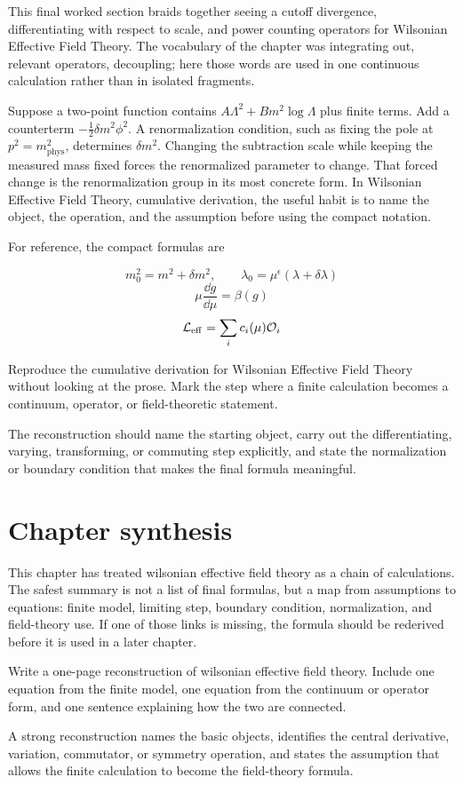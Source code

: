 This final worked section braids together seeing a cutoff divergence, differentiating with respect to scale, and power counting operators for Wilsonian Effective Field Theory.  The vocabulary of the chapter was integrating out, relevant operators, decoupling; here those words are used in one continuous calculation rather than in isolated fragments.

Suppose a two-point function contains \(A\Lambda^2+B m^2\log\Lambda\) plus finite terms.  Add a counterterm \(-\frac12\delta m^2\phi^2\).  A renormalization condition, such as fixing the pole at \(p^2=m_{\mathrm{phys}}^2\), determines \(\delta m^2\).  Changing the subtraction scale while keeping the measured mass fixed forces the renormalized parameter to change.  That forced change is the renormalization group in its most concrete form.  In Wilsonian Effective Field Theory, cumulative derivation, the useful habit is to name the object, the operation, and the assumption before using the compact notation.

For reference, the compact formulas are

\[
  m_0^2=m^2+\delta m^2,\qquad \lambda_0=\mu^\epsilon(\lambda+\delta\lambda)
\]
\[
  \mu\frac{\dd g}{\dd\mu}=\beta(g)
\]
\[
  \mathcal L_{\mathrm{eff}}=\sum_i c_i(\mu)\mathcal O_i
\]

\begin{exercise}
Reproduce the cumulative derivation for Wilsonian Effective Field Theory without looking at the prose.  Mark the step where a finite calculation becomes a continuum, operator, or field-theoretic statement.
\begin{answer}
The reconstruction should name the starting object, carry out the differentiating, varying, transforming, or commuting step explicitly, and state the normalization or boundary condition that makes the final formula meaningful.
\end{answer}
\end{exercise}



\section{Chapter synthesis}

This chapter has treated wilsonian effective field theory as a chain of calculations.  The safest summary is not a list of final formulas, but a map from assumptions to equations: finite model, limiting step, boundary condition, normalization, and field-theory use.  If one of those links is missing, the formula should be rederived before it is used in a later chapter.

\begin{exercise}
Write a one-page reconstruction of wilsonian effective field theory.  Include one equation from the finite model, one equation from the continuum or operator form, and one sentence explaining how the two are connected.
\begin{answer}
A strong reconstruction names the basic objects, identifies the central derivative, variation, commutator, or symmetry operation, and states the assumption that allows the finite calculation to become the field-theory formula.
\end{answer}
\end{exercise}
